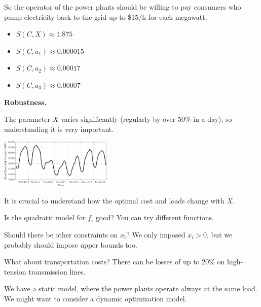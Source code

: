 \documentclass{workbook}
\begin{document}
\begin{solution}
\begin{slide}
\begin{parts}
		So the operator of the power plants should be willing to pay consumers who pump electricity back to the grid up to \$15/h for each megawatt.

		\item 	\begin{itemize}
			\item $S(C,X) \approx 1.875$
			\item $S(C,a_1) \approx 0.000015$
			\item $S(C,a_2) \approx 0.00017$
			\item $S(C,a_3) \approx 0.00007$
		\end{itemize}


	
\end{parts}
	
\end{slide}
	
\end{solution}


\begin{slide}

\question

\textbf{Robustness.} 

\begin{parts}
	\item The parameter $X$ varies significantly (regularly by over 50\% in a day), so understanding it is very important.

\begin{center}
	\includegraphics[width=0.4\textwidth]{images/energydemand.png}
\end{center}
	

It is crucial to understand how the optimal cost and loads change with $X$.


	\item Is the quadratic model for $f_i$ good? You can try different functions.
	\item Should there be other constraints on $x_i$? We only imposed $x_i>0$, but we probably should impose upper bounds too.
	\item What about transportation costs? There can be losses of up to 20\% on high-tension transmission lines.
	\item We have a static model, where the power plants operate always at the same load. We might want to consider a dynamic optimization model.
\end{parts}



\end{slide}
\end{document}
